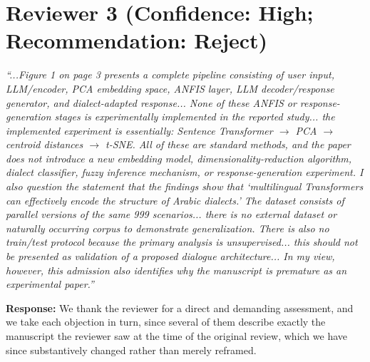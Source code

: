 \documentclass[11pt]{article}
\begin{document}
\section*{Reviewer 3 (Confidence: High; Recommendation: Reject)}
\textit{``...Figure 1 on page 3 presents a complete pipeline consisting of user input, LLM/encoder, PCA embedding space, ANFIS layer, LLM decoder/response generator, and dialect-adapted response... None of these ANFIS or response-generation stages is experimentally implemented in the reported study... the implemented experiment is essentially: Sentence Transformer $\to$ PCA $\to$ centroid distances $\to$ t-SNE. All of these are standard methods, and the paper does not introduce a new embedding model, dimensionality-reduction algorithm, dialect classifier, fuzzy inference mechanism, or response-generation experiment. I also question the statement that the findings show that `multilingual Transformers can effectively encode the structure of Arabic dialects.' The dataset consists of parallel versions of the same 999 scenarios... there is no external dataset or naturally occurring corpus to demonstrate generalization. There is also no train/test protocol because the primary analysis is unsupervised... this should not be presented as validation of a proposed dialogue architecture... In my view, however, this admission also identifies why the manuscript is premature as an experimental paper.''}

\textbf{Response:} We thank the reviewer for a direct and demanding assessment, and we take each objection in turn, since several of them describe exactly the manuscript the reviewer saw at the time of the original review, which we have since substantively changed rather than merely reframed.
\end{document}

